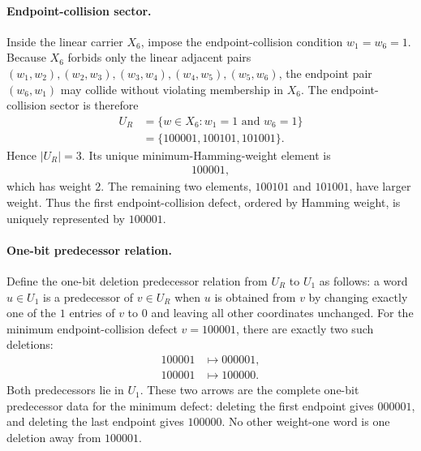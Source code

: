 \paragraph{Endpoint-collision sector.}
Inside the linear carrier $X_6$, impose the endpoint-collision condition $w_1=w_6=1$.  Because $X_6$ forbids only the linear adjacent pairs $(w_1,w_2),(w_2,w_3),(w_3,w_4),(w_4,w_5),(w_5,w_6)$, the endpoint pair $(w_6,w_1)$ may collide without violating membership in $X_6$.  The endpoint-collision sector is therefore
$$
\begin{aligned}
U_R
&=\{w\in X_6: w_1=1\text{ and }w_6=1\}\\
&=\{100001,100101,101001\}.
\end{aligned}
$$
Hence $|U_R|=3$.  Its unique minimum-Hamming-weight element is
$$
\begin{aligned}
100001,
\end{aligned}
$$
which has weight $2$.  The remaining two elements, $100101$ and $101001$, have larger weight.  Thus the first endpoint-collision defect, ordered by Hamming weight, is uniquely represented by $100001$.

\paragraph{One-bit predecessor relation.}
Define the one-bit deletion predecessor relation from $U_R$ to $U_1$ as follows: a word $u\in U_1$ is a predecessor of $v\in U_R$ when $u$ is obtained from $v$ by changing exactly one of the $1$ entries of $v$ to $0$ and leaving all other coordinates unchanged.  For the minimum endpoint-collision defect $v=100001$, there are exactly two such deletions:
$$
\begin{aligned}
100001&\longmapsto 000001,\\
100001&\longmapsto 100000.
\end{aligned}
$$
Both predecessors lie in $U_1$.  These two arrows are the complete one-bit predecessor data for the minimum defect: deleting the first endpoint gives $000001$, and deleting the last endpoint gives $100000$.  No other weight-one word is one deletion away from $100001$.

